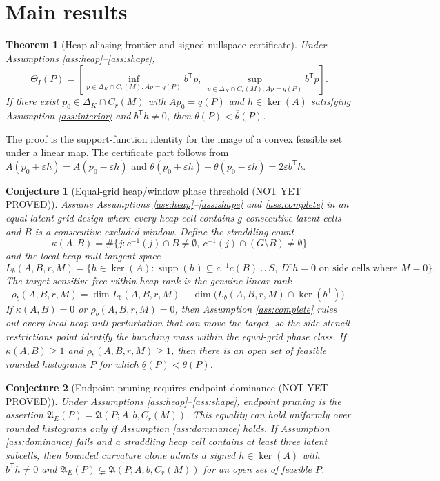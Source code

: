 \documentclass[11pt]{article}
\newcommand{\transpose}{\mathsf{T}}
\theoremstyle{definition}
\theoremstyle{plain}
\newtheorem{theorem}{Theorem}
\newtheorem{conjecture}{Conjecture}
\theoremstyle{remark}
\begin{document}
\section{Main results}
\begin{theorem}[Heap-aliasing frontier and signed-nullspace certificate]\label{thm:frontier}
Under Assumptions \ref{ass:heap}--\ref{ass:shape},
\[
  \Theta_I(P)=\left[\inf_{p\in\Delta_K\cap C_r(M):Ap=q(P)}b^\transpose p,\ 
  \sup_{p\in\Delta_K\cap C_r(M):Ap=q(P)}b^\transpose p\right].
\]
If there exist $p_0\in\Delta_K\cap C_r(M)$ with $Ap_0=q(P)$ and $h\in\ker(A)$ satisfying Assumption \ref{ass:interior} and $b^\transpose h\ne0$, then $\underline\theta(P)<\overline\theta(P)$.
\end{theorem}
The proof is the support-function identity for the image of a convex feasible set under a linear map. The certificate part follows from $A(p_0+\varepsilon h)=A(p_0-\varepsilon h)$ and $\theta(p_0+\varepsilon h)-\theta(p_0-\varepsilon h)=2\varepsilon b^\transpose h$.

\begin{conjecture}[Equal-grid heap/window phase threshold (NOT YET PROVED)]\label{conj:phase}
Assume Assumptions \ref{ass:heap}--\ref{ass:shape} and \ref{ass:complete} in an equal-latent-grid design where every heap cell contains $g$ consecutive latent cells and $B$ is a consecutive excluded window. Define the straddling count
\[
  \kappa(A,B)=\#\{j: c^{-1}(j)\cap B\ne\emptyset,\ c^{-1}(j)\cap (G\setminus B)\ne\emptyset\}
\]
and the local heap-null tangent space
\[
  L_b(A,B,r,M)=\{h\in\ker(A):\operatorname{supp}(h)\subseteq c^{-1}c(B)\cup S,\ D^r h=0\text{ on side cells where }M=0\}.
\]
The target-sensitive free-within-heap rank is the genuine linear rank
\[
  \rho_b(A,B,r,M)=\dim L_b(A,B,r,M)-\dim\bigl(L_b(A,B,r,M)\cap\ker(b^\transpose)\bigr).
\]
If $\kappa(A,B)=0$ or $\rho_b(A,B,r,M)=0$, then Assumption \ref{ass:complete} rules out every local heap-null perturbation that can move the target, so the side-stencil restrictions point identify the bunching mass within the equal-grid phase class. If $\kappa(A,B)\ge1$ and $\rho_b(A,B,r,M)\ge1$, then there is an open set of feasible rounded histograms $P$ for which $\underline\theta(P)<\overline\theta(P)$.
\end{conjecture}

\begin{conjecture}[Endpoint pruning requires endpoint dominance (NOT YET PROVED)]\label{conj:endpoint}
Under Assumptions \ref{ass:heap}--\ref{ass:shape}, endpoint pruning is the assertion $\mathfrak A_E(P)=\mathfrak A(P;A,b,C_r(M))$. This equality can hold uniformly over rounded histograms only if Assumption \ref{ass:dominance} holds. If Assumption \ref{ass:dominance} fails and a straddling heap cell contains at least three latent subcells, then bounded curvature alone admits a signed $h\in\ker(A)$ with $b^\transpose h\ne0$ and $\mathfrak A_E(P)\subsetneq \mathfrak A(P;A,b,C_r(M))$ for an open set of feasible $P$.
\end{conjecture}
\end{document}
